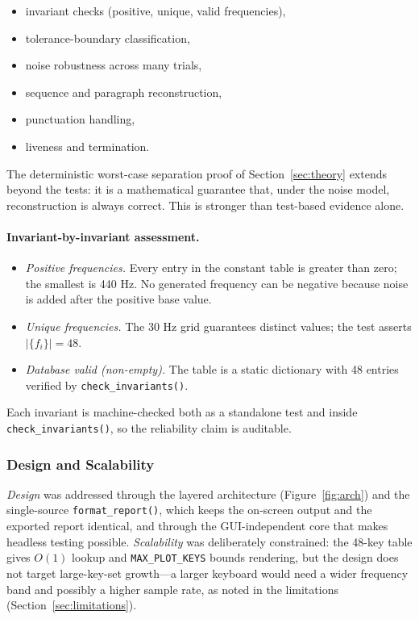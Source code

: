 \documentclass[11pt,a4paper]{article}
\begin{document}
\begin{itemize}
    \item invariant checks (positive, unique, valid frequencies),
    \item tolerance-boundary classification,
    \item noise robustness across many trials,
    \item sequence and paragraph reconstruction,
    \item punctuation handling,
    \item liveness and termination.
\end{itemize}

The deterministic worst-case separation proof of Section~\ref{sec:theory}
extends beyond the tests: it is a mathematical guarantee that, under the noise
model, reconstruction is always correct. This is stronger than test-based
evidence alone.

\paragraph{Invariant-by-invariant assessment.}
\begin{itemize}
    \item \emph{Positive frequencies.} Every entry in the constant table is
          greater than zero; the smallest is 440 Hz. No generated frequency can
          be negative because noise is added after the positive base value.
    \item \emph{Unique frequencies.} The 30 Hz grid guarantees distinct values;
          the test asserts $|\{f_i\}| = 48$.
    \item \emph{Database valid (non-empty).} The table is a static dictionary
          with 48 entries verified by \texttt{check\_invariants()}.
\end{itemize}

Each invariant is machine-checked both as a standalone test and inside
\texttt{check\_invariants()}, so the reliability claim is auditable.

\subsubsection{Design and Scalability}

\emph{Design} was addressed through the layered architecture
(Figure~\ref{fig:arch}) and the single-source \texttt{format\_report()}, which
keeps the on-screen output and the exported report identical, and through the
GUI-independent core that makes headless testing possible. \emph{Scalability}
was deliberately constrained: the 48-key table gives $O(1)$ lookup and
\texttt{MAX\_PLOT\_KEYS} bounds rendering, but the design does not target
large-key-set growth---a larger keyboard would need a wider frequency band and
possibly a higher sample rate, as noted in the limitations
(Section~\ref{sec:limitations}).
\end{document}
